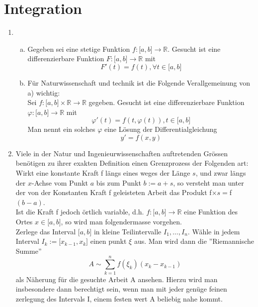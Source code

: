 \chapter{Integration}

\begin{enumerate}[\indent I)]
\item \begin{enumerate}[a)]
\item Gegeben sei eine stetige Funktion $f : \lbrack a,b\rbrack \rightarrow \mathbb{R}$. Gesucht ist eine differenzierbare Funktion $F: \lbrack a,b\rbrack \rightarrow \mathbb{R}$ mit $$F'(t)=f(t), \forall t \in \lbrack a,b \rbrack$$
\item Für Naturwissenschaft und technik ist die Folgende Verallgemeinung von a) wichtig:\\
Sei $f:\lbrack a,b\rbrack \times \mathbb{R} \rightarrow \mathbb{R}$ gegeben. Gesucht ist eine differenzierbare Funktion $\varphi : \lbrack a,b\rbrack \rightarrow \mathbb{R}$ mit $$\varphi ' (t)=f(t,\varphi (t)), t\in \lbrack a,b \rbrack$$ Man nennt ein solches $\varphi$ eine Lösung der Differentialgleichung $$y'=f(x,y)$$
\end{enumerate}
\item Viele in der Natur und Ingenieurwissenschaften auftretenden Grössen benötigen zu ihrer exakten Definition einen Grenzprozess der Folgenden art: \\
Wirkt eine konstante Kraft f längs eines weges der Länge $s$, und zwar längs der $x$-Achse vom Punkt $a$ bis zum Punkt $b:=a+s$, so versteht man unter der von der Konstanten Kraft f geleisteten Arbeit das Produkt f$\times s=$f$(b-a)$. \\
Ist die Kraft f jedoch örtlich variable, d.h. $f:\lbrack a,b\rbrack \rightarrow \mathbb{R}$ eine Funktion des Ortes $x \in \lbrack a,b\rbrack$, so wird man folgendermasse vorgehen.\\

Zerlege das Interval $\lbrack a,b\rbrack$ in kleine Teilintervalle $I_{1},\dots, I_{n}$. Wähle in jedem Interval $I_{k}:=\lbrack x_{k-1}, x_{k}\rbrack$ einen punkt $\xi$ aus. Man wird dann die ''Riemannische Summe'' $$A \sim  \sum\limits_{k = 1}^n {f({\xi_k})({x_k} - {x_{k - 1}})} $$  als Näherung für die gesuchte Arbeit A ansehen. Hierzu wird man insbesondere dann berechtigt sein, wenn man mit jeder genüge feinen zerlegung des Intervals I, einem festen wert A beliebig nahe kommt. 


\end{enumerate}
